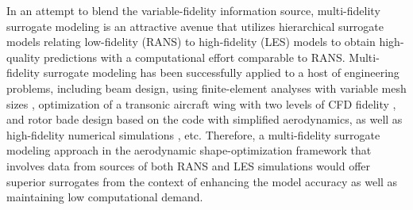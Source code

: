 In an attempt to blend the variable-fidelity information source, multi-fidelity surrogate modeling is an attractive avenue that utilizes hierarchical surrogate models relating low-fidelity (RANS) to high-fidelity (LES) models to obtain high-quality predictions with a computational effort comparable to RANS. Multi-fidelity surrogate modeling has been successfully applied to a host of engineering problems, including beam design, using finite-element analyses with variable mesh sizes \citep{leary2003knowledgebased}, optimization of a transonic aircraft wing with two levels of CFD fidelity \citep{forrester2007multifidelity}, and rotor bade design based on the code with simplified aerodynamics, as well as high-fidelity numerical simulations \citep{collins2008multifidelity}, etc. Therefore, a multi-fidelity surrogate modeling approach in the aerodynamic shape-optimization framework that involves data from sources of both RANS and LES simulations would offer superior surrogates from the context of enhancing the model accuracy as well as maintaining low computational demand.

